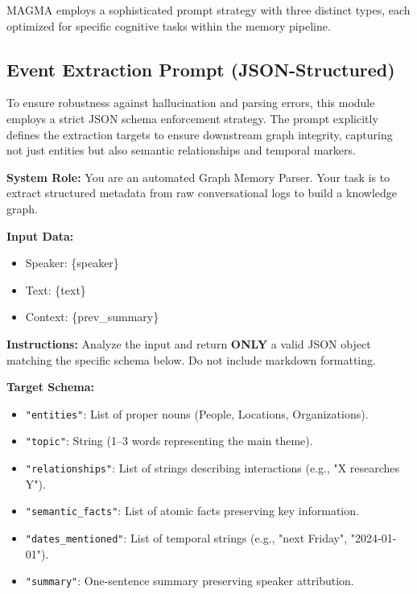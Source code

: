 \documentclass[11pt]{article}
\begin{document}
MAGMA employs a sophisticated prompt strategy with three distinct types, each optimized for specific cognitive tasks within the memory pipeline.

\subsection{Event Extraction Prompt (JSON-Structured)}
To ensure robustness against hallucination and parsing errors, this module employs a strict JSON schema enforcement strategy. The prompt explicitly defines the extraction targets to ensure downstream graph integrity, capturing not just entities but also semantic relationships and temporal markers.

\begin{tcolorbox}[colback=gray!10, colframe=black, title=\textbf{System Prompt: Event Extractor}, breakable]
\small
\raggedright
\textbf{System Role:} You are an automated Graph Memory Parser. Your task is to extract structured metadata from raw conversational logs to build a knowledge graph.

\textbf{Input Data:}
\begin{itemize}[nosep, leftmargin=*]
    \item Speaker: \{speaker\}
    \item Text: \{text\}
    \item Context: \{prev\_summary\}
\end{itemize}

\textbf{Instructions:}
Analyze the input and return \textbf{ONLY} a valid JSON object matching the specific schema below. Do not include markdown formatting.

\textbf{Target Schema:}
\begin{itemize}[nosep, leftmargin=*]
    \item \texttt{"entities"}: List of proper nouns (People, Locations, Organizations).
    \item \texttt{"topic"}: String (1--3 words representing the main theme).
    \item \texttt{"relationships"}: List of strings describing interactions (e.g., "X researches Y").
    \item \texttt{"semantic\_facts"}: List of atomic facts preserving key information.
    \item \texttt{"dates\_mentioned"}: List of temporal strings (e.g., "next Friday", "2024-01-01").
    \item \texttt{"summary"}: One-sentence summary preserving speaker attribution.
\end{itemize}
\end{tcolorbox}
\end{document}

